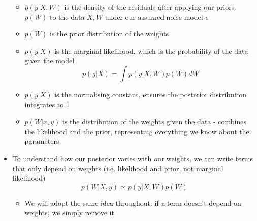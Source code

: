 \documentclass[12pt]{article}
\begin{document}
\begin{itemize}
\begin{itemize}
        \item $p(y|X,W)$ is the density of the residuals after applying our priors $p(W)$ to the data $X,W$ under our assumed noise model $\epsilon$
        \item $p(W)$ is the prior distribution of the weights
        \item $p(y|X)$ is the marginal likelihood, which is the probability of the data given the model
\begin{equation}
    p(y|X) = \int p(y|X,W)p(W)dW
\end{equation}
        \item $p(y|X)$ is the normalising constant, ensures the posterior distribution integrates to 1
        \item $p(W|x, y)$ is the distribution of the weights given the data - combines the likelihood and the prior, representing everything we know about the parameters
    \end{itemize}
    \item To understand how our posterior varies with our weights, we can write terms that only depend on weights (i.e. likelihood and prior, not marginal likelihood)
\begin{equation}
    p(W|X, y) \propto p(y|X,W)p(W)
\end{equation}
     \begin{itemize}
         \item We will adopt the same idea throughout: if a term doesn't depend on weights, we simply remove it
     \end{itemize}
\end{itemize}
\end{document}
